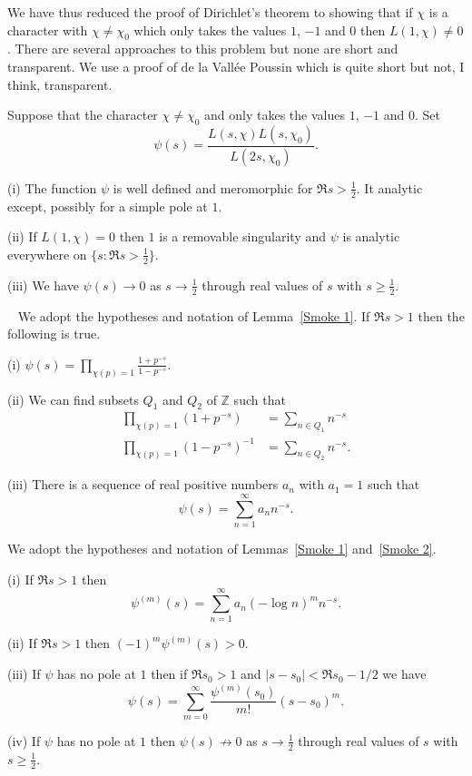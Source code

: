 We have thus reduced the proof of Dirichlet's theorem
to showing that if  $\chi$ is a character
with $\chi\neq \chi_{0}$ which only
takes the values $1$, $-1$ and $0$ then $L(1,\chi)\neq 0$.
There are several approaches to this problem but
none are short and transparent. We use a proof
of de la Vall{\'{e}}e Poussin which is quite short
but not, I think, transparent.
\begin{lemma}\label{Smoke 1} Suppose that the
character $\chi\neq \chi_{0}$ and only
takes the values $1$, $-1$ and $0$. Set
\[\psi(s)=\frac{L(s,\chi)L(s,\chi_{0})}{L(2s,\chi_{0})}.\]

(i) The function $\psi$ is well defined and meromorphic
for $\Re s>\frac{1}{2}$. It analytic except, possibly
for a simple pole at $1$.

(ii) If  $L(1,\chi)=0$  then $1$ is a removable singularity
and $\psi$ is analytic everywhere on $\{s:\Re s>\frac{1}{2}\}$.

(iii) We have $\psi(s)\rightarrow 0$ as $s\rightarrow \frac{1}{2}$
through real values of $s$ with $s\geq \frac{1}{2}$.
\end{lemma}
\begin{lemma}~\label{Smoke 2}
We adopt the hypotheses and notation of
Lemma~\ref{Smoke 1}. If $\Re s>1$ then the following is true.

(i) ${\displaystyle
\psi(s)=\prod_{\chi(p)=1}\frac{1+p^{-s}}{1-p^{-s}}.}$

(ii) We can find subsets $Q_{1}$ and $Q_{2}$ of $\mathbb{Z}$
such that
\begin{align*}
\prod_{\chi(p)=1}(1+p^{-s})&=\sum_{n\in Q_{1}}n^{-s}\\
\prod_{\chi(p)=1}(1-p^{-s})^{-1}&=\sum_{n\in Q_{2}}n^{-s}.
\end{align*}

(iii) There is a sequence of real positive numbers $a_{n}$
with $a_{1}=1$ such that
\[\psi(s)=\sum_{n=1}^{\infty}a_{n}n^{-s}.\]
\end{lemma}
\begin{lemma} We adopt the hypotheses and notation of
Lemmas~\ref{Smoke 1} and~\ref{Smoke 2}.

(i) If $\Re s>1$ then
\[\psi^{(m)}(s)=\sum_{n=1}^{\infty}a_{n}(-\log n)^{m}n^{-s}.\]

(ii) If $\Re s>1$ then $(-1)^{m}\psi^{(m)}(s)>0$.

(iii) If $\psi$ has no pole at $1$ then if $\Re s_{0}>1$
and $|s-s_{0}|<\Re s_{0}-1/2$ we have
\[\psi(s)=\sum_{m=0}^{\infty}
\frac{\psi^{(m)}(s_{0})}{m!}(s-s_{0})^{m}.\]

(iv) If $\psi$ has no pole at $1$ then
$\psi(s)\nrightarrow 0$ as $s\rightarrow \frac{1}{2}$
through real values of $s$ with $s\geq \frac{1}{2}$.
\end{lemma}

